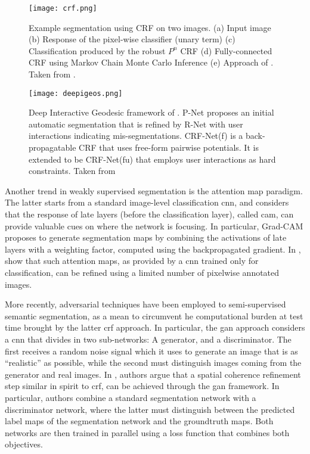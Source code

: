 \begin{figure}[!h]
  \centering
  \texttt{[image: crf.png]}
  \caption{Example segmentation using CRF on two images. (a) Input image (b) Response of the pixel-wise classifier (unary term) (c) Classification produced by the robust $P^{n}$ CRF \cite{kohli09} (d) Fully-connected CRF using Markov Chain Monte Carlo Inference (e) Approach of \cite{krahenbuhl11}. Taken from \cite{krahenbuhl11}.}
  \label{fig:crf}
\end{figure}

\begin{figure}[!h]
  \centering
  \texttt{[image: deepigeos.png]}
  \caption{Deep Interactive Geodesic framework of \cite{wang18}. P-Net proposes an initial automatic segmentation that is refined by R-Net with user interactions indicating mis-segmentations. CRF-Net(f) is a
    back-propagatable CRF that uses free-form pairwise potentials.
    It is extended to be CRF-Net(fu) that employs user interactions as hard constraints. Taken from \cite{wang18}}
  \label{fig:deepigeos}
\end{figure}

Another trend in weakly supervised segmentation is the attention map paradigm.
The latter starts from a standard image-level classification \gls{cnn}, and considers that the response of late layers (before the classification layer), called \gls{cam}, can provide valuable cues on where the network is focusing.
In particular, Grad-CAM \cite{selvaraju17} proposes to generate segmentation maps by combining the activations of late layers with a weighting factor, computed using the backpropagated gradient.
In \cite{li18}, show that such attention maps, as provided by a \gls{cnn} trained only for classification, can be refined using a limited number of pixelwise annotated images.

More recently, adversarial techniques have been employed to semi-supervised semantic segmentation, as a mean to circumvent he computational burden at test time brought by the latter \gls{crf} approach.
In particular, the \gls{gan} approach \cite{goodfellow14} considers a \gls{cnn} that divides in two sub-networks: A generator, and a discriminator.
The first receives a random noise signal which it uses to generate an image that is as ``realistic'' as possible, while the second must distinguish images coming from the generator and real images.
In \cite{luc16}, authors argue that a spatial coherence refinement step similar in spirit to \gls{crf}, can be achieved through the \gls{gan} framework.
In particular, authors combine a standard segmentation network with a discriminator network,
where the latter must distinguish between the predicted label maps of the segmentation network and the groundtruth maps.
Both networks are then trained in parallel using a loss function that combines both objectives.


